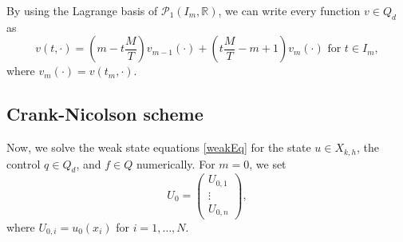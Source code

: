 By using the Lagrange basis of $\mathcal{P}_1(I_m,\mathbb{R})$, we can write every function $v \in Q_d$ as
\begin{displaymath}
v(t,\cdot)=\left(m-t\frac{M}{T}\right) v_{m-1}(\cdot)+\left(t\frac{M}{T}-m+1\right) v_m(\cdot)\text{ for }t\in I_m,
\end{displaymath}
where $v_m(\cdot)=v(t_m,\cdot)$.


\subsection{Crank-Nicolson scheme}
Now, we solve the weak state equations \eqref{weakEq} for the state $u\in X_{k,h}$, the control $q\in Q_d$, and $f\in Q$ numerically. For $m=0$, we set
\begin{displaymath}
U_0=\begin{pmatrix} U_{0,1} \\ \vdots \\ U_{0,n} \end{pmatrix},
\end{displaymath}
where $U_{0,i}=u_0(x_i)$ for $i=1,\dotsc,N$.

